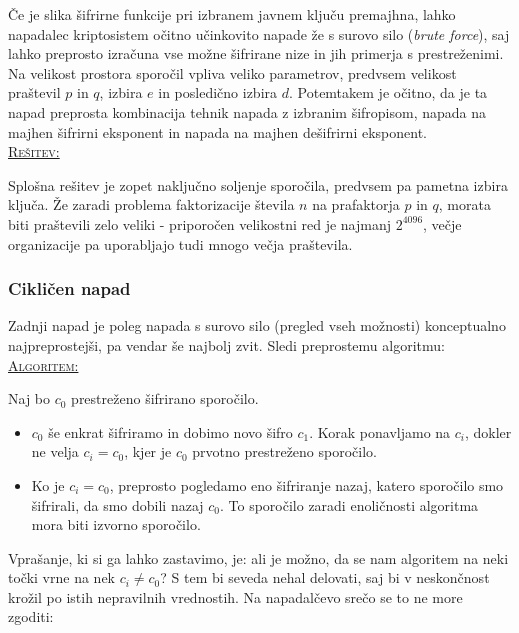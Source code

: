 \documentclass[a4paper, 12pt]{article} %
\newenvironment{matematika}[1]{
\textcolor{bostonuniversityred}{\underline{\textsc{#1:}}}
}{
}
\begin{document}
Če je slika šifrirne funkcije pri izbranem javnem ključu premajhna, lahko napadalec kriptosistem očitno učinkovito napade že s surovo silo (\emph{brute force}), saj lahko preprosto izračuna vse možne šifrirane nize in jih primerja s prestreženimi. Na velikost prostora sporočil vpliva veliko parametrov, predvsem velikost praštevil $p$ in $q$, izbira $e$ in posledično izbira $d$. Potemtakem je očitno, da je ta napad preprosta kombinacija tehnik napada z izbranim šifropisom, napada na majhen šifrirni eksponent in napada na majhen dešifrirni eksponent. \\

\begin{matematika}{Rešitev}
Splošna rešitev je zopet naključno soljenje sporočila, predvsem pa pametna izbira ključa. Že zaradi problema faktorizacije števila $n$ na prafaktorja $p$ in $q$, morata biti praštevili zelo veliki - priporočen velikostni red je najmanj $2^{4096}$, večje organizacije pa uporabljajo tudi mnogo večja praštevila.
\end{matematika}

\subsubsection{Cikličen napad}

Zadnji napad je poleg napada s surovo silo (pregled vseh možnosti) konceptualno najpreprostejši, pa vendar še najbolj zvit. Sledi preprostemu algoritmu: \\

\begin{matematika}{Algoritem}
Naj bo $c_0$ prestreženo šifrirano sporočilo.
\begin{itemize}[label=]
\item $c_0$ še enkrat šifriramo in dobimo novo šifro $c_1$. Korak ponavljamo na $c_i$, dokler ne velja $c_i = c_0$, kjer je $c_0$ prvotno prestreženo sporočilo.
\item Ko je $c_i = c_0$, preprosto pogledamo eno šifriranje nazaj, katero sporočilo smo šifrirali, da smo dobili nazaj $c_0$. To sporočilo zaradi enoličnosti algoritma mora biti izvorno sporočilo. \\
\end{itemize}
\end{matematika}

Vprašanje, ki si ga lahko zastavimo, je: ali je možno, da se nam algoritem na neki točki vrne na nek $c_i \neq c_0$? S tem bi seveda nehal delovati, saj bi v neskončnost krožil po istih nepravilnih vrednostih. Na napadalčevo srečo se to ne more zgoditi: \\
\end{document}

